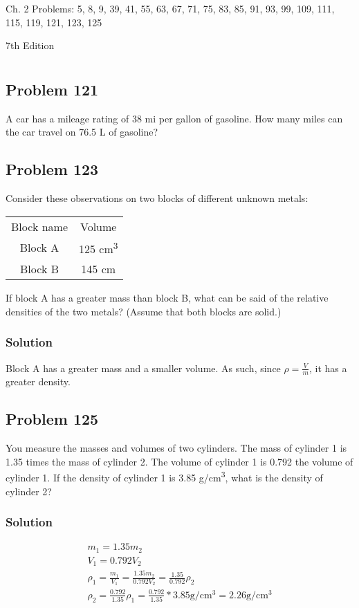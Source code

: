 \documentclass[11pt]{report}
\begin{document}
Ch. 2 Problems: 5, 8, 9, 39, 41, 55, 63, 67, 71, 75, 83, 85, 91, 93, 99, 109, 111, 115, 119, 121, 123, 125

7th Edition
\setcounter{chapter}{1}
\pagebreak
\chapter{}

\section{Problem 121}
A car has a mileage rating of 38 mi per gallon of gasoline. How many miles can the car travel on 76.5 L of gasoline?

\section{Problem 123}
Consider these observations on two blocks of different unknown metals:

\begin{center}
    \begin{tabular*}{0.25\textwidth}{c c}
        Block name  & Volume \\
        Block A     & 125 \unit{\centi\meter^3}\\
        Block B     & 145 \unit{\centi\meter}
    \end{tabular*}
\end{center}          
        
If block A has a greater mass than block B, what can be said of the relative densities of the two metals? (Assume that both blocks are solid.)

\subsection{Solution}
Block A has a greater mass and a smaller volume. As such, since $\rho = \frac{V}{m}$, it has a greater density.

\section{Problem 125}
You measure the masses and volumes of two cylinders. The mass of cylinder 1 is 1.35 times the mass of cylinder 2. The volume of cylinder 1 is 0.792 the volume of cylinder 1. If the density of cylinder 1 is 3.85 \unit{\gram/\centi\meter^3}, what is the density of cylinder 2?

\subsection{Solution}
\begin{gather}
    m_1 = 1.35 m_2\\
    V_1 = 0.792 V_2\\
    \rho_1 = \frac{m_1}{V_1} = \frac{1.35 m_2}{0.792 V_2} = \frac{1.35}{0.792}\rho_2\\
    \rho_2 = \frac{0.792}{1.35}\rho_1 = \frac{0.792}{1.35}*3.85 \unit{\gram/\centi\meter^3} = \boxed{2.26 \unit{\gram/\centi\meter^3}}
\end{gather}
\end{document}
